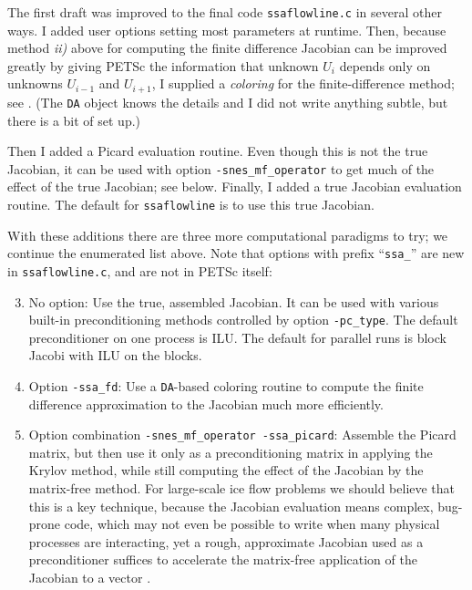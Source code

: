 \documentclass[11pt,final,reqno]{amsart}
\begin{document}
The first draft was improved to the final code \texttt{ssaflowline.c} in several other ways.  I added user options setting most parameters at runtime.  Then, because method \emph{ii)} above for computing the finite difference Jacobian can be improved greatly by giving PETSc the information that unknown $U_i$ depends only on unknowns $U_{i-1}$ and $U_{i+1}$, I supplied a \emph{coloring} for the finite-difference method; see \cite{petsc-user-ref}.  (The \texttt{DA} object knows the details and I did not write anything subtle, but there is a bit of set up.)

Then I added a Picard evaluation routine.  Even though this is not the true Jacobian, it can be used with option \texttt{-snes\_mf\_operator} to get much of the effect of the true Jacobian; see below.  Finally, I added a true Jacobian evaluation routine.  The default for \texttt{ssaflowline} is to use this true Jacobian.

With these additions there are three more computational paradigms to try; we continue the enumerated list above.  Note that options with prefix ``\texttt{ssa\_}'' are new in \texttt{ssaflowline.c}, and are not in PETSc itself:
\begin{enumerate}
\setcounter{enumi}{2}
\item No option:  Use the true, assembled Jacobian.  It can be used with various built-in preconditioning methods controlled by option \texttt{-pc\_type}.  The default preconditioner on one process is ILU.  The default for parallel runs is block Jacobi with ILU on the blocks.
\item Option \texttt{-ssa\_fd}:  Use a \texttt{DA}-based coloring routine to compute the finite difference approximation to the Jacobian much more efficiently.
\item Option combination \texttt{-snes\_mf\_operator -ssa\_picard}:  Assemble the Picard matrix, but then use it only as a preconditioning matrix in applying the Krylov method, while still computing the effect of the Jacobian by the matrix-free method.  For large-scale ice flow problems we should believe that this is a key technique, because the Jacobian evaluation means complex, bug-prone code, which may not even be possible to write when many physical processes are interacting, yet a rough, approximate Jacobian used as a preconditioner suffices to accelerate the matrix-free application of the Jacobian to a vector \cite{KnollKeyes2004}.
\end{enumerate}
\end{document}
